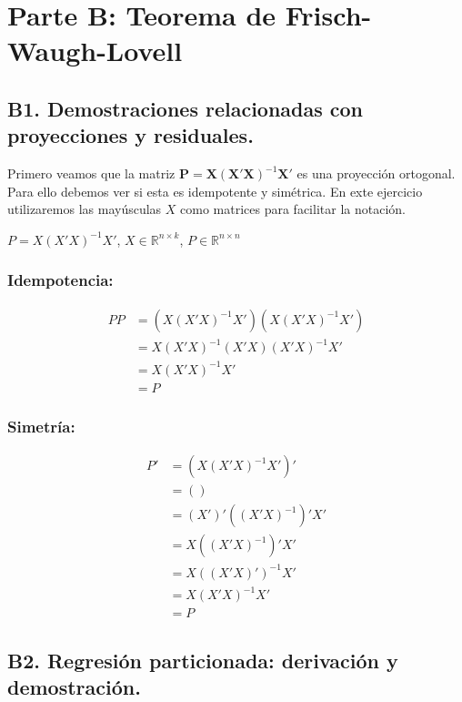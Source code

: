 \documentclass[12pt, letter]{article}
\begin{document}
                                
\section{Parte B: Teorema de Frisch-Waugh-Lovell}
\subsection{B1. Demostraciones relacionadas con proyecciones y residuales.}

Primero veamos que la matriz $\textbf{P} = \textbf{X}(\textbf{X}'\textbf{X})^{-1}\textbf{X}'$ es una proyección ortogonal. Para ello debemos ver si esta es idempotente y simétrica. En exte ejercicio utilizaremos las mayúsculas $X$ como matrices para facilitar la notación. 



\( P = X (X'X)^{-1} X' \), \quad \( X \in \mathbb{R}^{n \times k} \), \quad \( P \in \mathbb{R}^{n \times n} \)

\subsubsection*{Idempotencia:}
\begin{align*}
P P &= \left( X (X'X)^{-1} X' \right) \left( X (X'X)^{-1} X' \right) \\
    &= X (X'X)^{-1} (X'X) (X'X)^{-1} X' \\
    &= X (X'X)^{-1} X' \\
    &= P
\end{align*}

\subsubsection*{Simetría:}
\begin{align*}
P' &= \left( X (X'X)^{-1} X' \right)' \\
   &= \left(  \right) \\
   &= \left( X' \right)' \left( (X'X)^{-1} \right)' X' \\
   &= X \left( (X'X)^{-1} \right)' X' \\
   &= X \left( (X'X)' \right)^{-1} X' \\
   &= X \left( X'X \right)^{-1} X' \\
   &= P
\end{align*}


\subsection{B2. Regresión particionada: derivación y demostración.}
\end{document}
